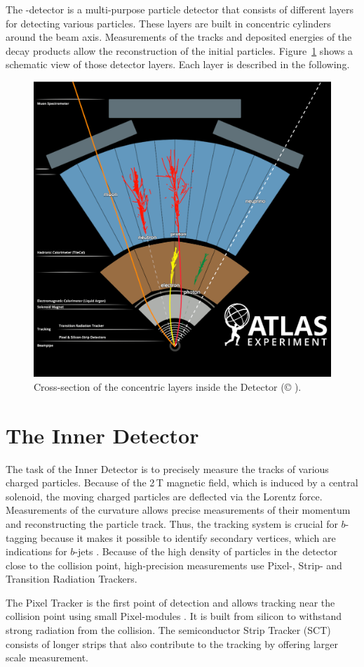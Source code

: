 \documentclass[bachelor,oneside, BCOR10mm,
			ngerman,english  %
]{GAUBM}
\begin{document}
The \atlas-detector \cite{atlas} is a multi-purpose particle detector that consists of different layers for detecting various particles. These layers are built in concentric cylinders around the beam axis. Measurements of the tracks and deposited energies of the decay products allow the reconstruction of the initial particles. Figure~\ref{fig:atlas} shows a schematic view of those detector layers. Each layer is described in the following. 

\begin{figure}[t]
	\centering
	\includegraphics[width=.61\textwidth]{figures/atlas/atlas3.png}
	\caption{Cross-section of the concentric layers inside the \atlas Detector (\copyright{} \cern).}
	\label{fig:atlas}
\end{figure}

\section*{The Inner Detector}
The task of the Inner Detector is to precisely measure the tracks of various charged particles. Because of the 2\,T magnetic field, which is induced by a central solenoid, the moving charged particles are deflected via the Lorentz force. Measurements of the curvature allows precise measurements of their momentum and reconstructing the particle track. Thus, the tracking system is crucial for $b$-tagging because it makes it possible to identify secondary vertices, which are indications for $b$-jets \cite{atlas}. Because of the high density of particles in the detector close to the collision point, high-precision measurements use Pixel-, Strip- and Transition Radiation Trackers.

The Pixel Tracker is the first point of detection and allows tracking near the collision point using small Pixel-modules \cite{atlas}. It is built from silicon to withstand strong radiation from the collision. The semiconductor Strip Tracker (SCT) consists of longer strips that also contribute to the tracking by offering larger scale measurement.
\end{document}
